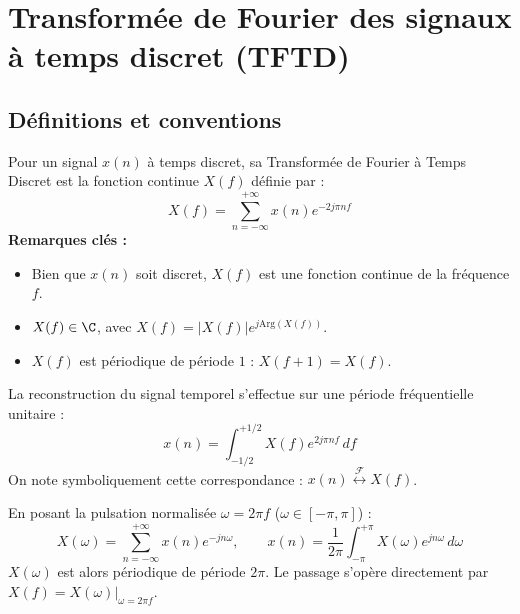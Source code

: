 \minitoc 


\section{Transformée de Fourier des signaux à temps discret (TFTD)}

\subsection{Définitions et conventions}

\begin{definition}
    Pour un signal $x(n)$ à temps discret, sa Transformée de Fourier à Temps Discret est la fonction continue $X(f)$ définie par : 
        \begin{equation}
            \boxed{X(f) = \sum_{n=-\infty}^{+\infty} x(n) e^{-2j \pi n f}}
        \end{equation}
    \textbf{Remarques clés :}
    \begin{itemize}
        \item Bien que $x(n)$ soit discret, $X(f)$ est une fonction continue de la fréquence $f$.
        \item $X(f) \in \C$, avec $X(f) = |X(f)| e^{j \text{Arg}(X(f))}$.
        \item $X(f)$ est périodique de période $1$ : $X(f + 1) = X(f)$.
    \end{itemize}
\end{definition}

\begin{definition}
    La reconstruction du signal temporel s'effectue sur une période fréquentielle unitaire :
        \begin{equation}
            x(n) = \int_{-1/2}^{+1/2} X(f) e^{2j \pi n f} \, df
        \end{equation}
    On note symboliquement cette correspondance : $x(n) \overset{\mathcal{F}}{\longleftrightarrow} X(f)$.
\end{definition}

\begin{remark}
    En posant la pulsation normalisée $\omega = 2\pi f$ ($\omega \in [-\pi, \pi]$) :
    \begin{equation}
        X(\omega) = \sum_{n=-\infty}^{+\infty} x(n) e^{-j n \omega}, \qquad x(n) = \frac{1}{2\pi} \int_{-\pi}^{+\pi} X(\omega) e^{j n \omega} \, d\omega
    \end{equation}
    $X(\omega)$ est alors périodique de période $2\pi$. Le passage s'opère directement par $X(f) = X(\omega)|_{\omega = 2\pi f}$.
\end{remark}

